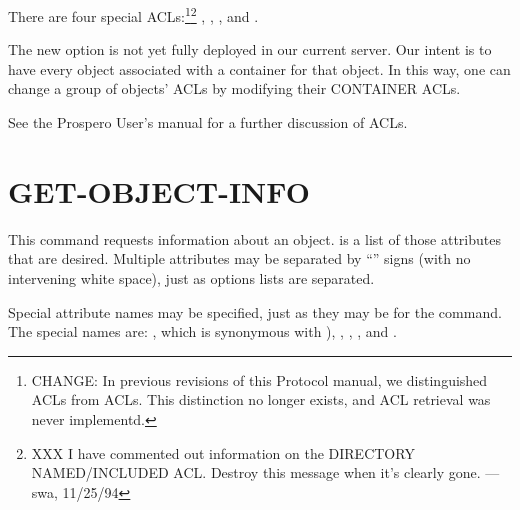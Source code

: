 There are four special  ACLs:\footnote{CHANGE: In previous
revisions of this Protocol manual, we distinguished  ACLs
from  ACLs.  This distinction no longer exists, and
 ACL retrieval was never
implementd.}\footnote{XXX I have commented out information on the
DIRECTORY NAMED/INCLUDED ACL.  Destroy this message when it's clearly
gone. ---swa, 11/25/94} , ,
, and . 

The new  option is not yet fully deployed in our
current server.  Our intent is to have every object associated with a
container for that object.  In this way, one can change a group of
objects' ACLs by modifying their CONTAINER ACLs.


See the Prospero User's manual for a further discussion of ACLs.

\section{GET-OBJECT-INFO}

\begin{command}
\commandsize
{}  
 
\selectlines
\end{command}

This command requests information about an object.
 is a list of those attributes
that are desired.  Multiple attributes may be separated by ``\lit{+}'' signs
(with no intervening white space), just as options lists are
separated.

Special attribute names may be specified, just as they may be for the
 command.  The special names are: , which is synonymous
with ), , , , and
. 

